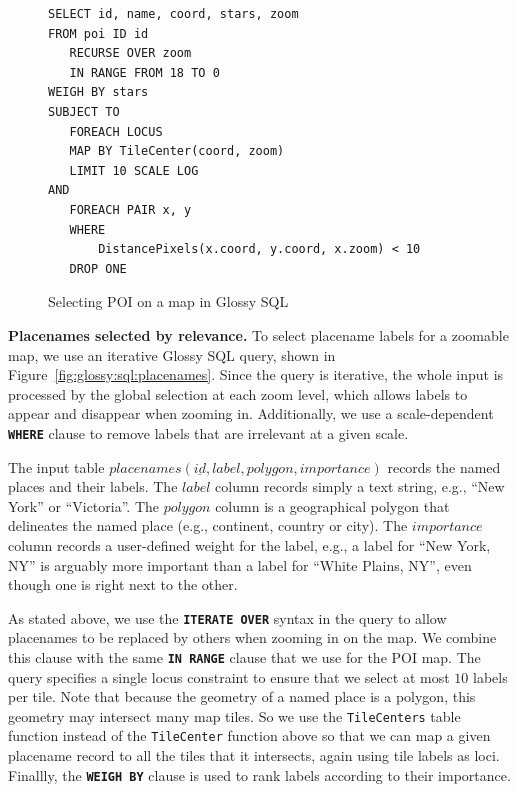 \documentclass[11pt, oneside]{report}
\newcommand{\minisec}[1]{\noindent\textbf{#1.}}
\begin{document}
\begin{figure}[!t]
\begin{center}
\begin{lstlisting}
SELECT id, name, coord, stars, zoom
FROM poi ID id
   RECURSE OVER zoom 
   IN RANGE FROM 18 TO 0 
WEIGH BY stars
SUBJECT TO
   FOREACH LOCUS
   MAP BY TileCenter(coord, zoom)
   LIMIT 10 SCALE LOG
AND
   FOREACH PAIR x, y
   WHERE 
       DistancePixels(x.coord, y.coord, x.zoom) < 10
   DROP ONE
\end{lstlisting}
\vspace*{-2ex}
\caption{Selecting POI on a map in Glossy SQL}
\label{fig:glossy:sql:poi}
\end{center}
\vspace*{-5ex}
\end{figure}

\minisec{Placenames selected by relevance}
To select placename labels for a zoomable map, we use an iterative Glossy SQL query, shown in Figure~\ref{fig:glossy:sql:placenames}. Since the query is iterative, the whole input is processed by the global selection at each zoom level, which allows labels to appear and disappear when zooming in. Additionally, we use a scale-dependent \textbf{\texttt{WHERE}} clause to remove labels that are irrelevant at a given scale.

The input table $placenames(\underline{id}, label, polygon, importance)$ records the named places and their labels. The $label$ column records simply a text string, e.g., ``New York'' or ``Victoria''. The $polygon$ column is a geographical polygon that delineates the named place (e.g., continent, country or city). The $importance$ column records a user-defined weight for the label, e.g., a label for ``New York, NY'' is arguably more important than a label for ``White Plains, NY'', even though one is right next to the other.

As stated above, we use the \textbf{\texttt{ITERATE OVER}} syntax in the query to allow placenames to be replaced by others when zooming in on the map. We combine this clause with the same \textbf{\texttt{IN RANGE}} clause that we use for the POI map. The query specifies a single locus constraint to ensure that we select at most $10$ labels per tile. Note that because the geometry of a named place is a polygon, this geometry may intersect many map tiles. So we use the \texttt{TileCenters} table function instead of the \texttt{TileCenter} function above so that we can map a given placename record to all the tiles that it intersects, again using tile labels as loci.  
Finallly, the \textbf{\texttt{WEIGH BY}} clause is used to rank labels according to their importance. 
\end{document}
